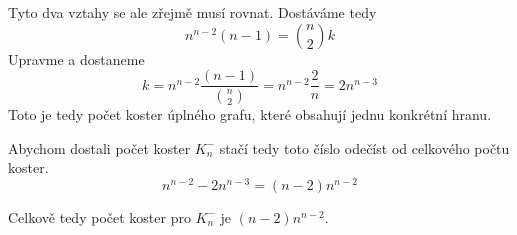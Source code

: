 \documentclass[../main.tex]{subfiles}
\begin{document}
Tyto dva vztahy se ale zřejmě musí rovnat. Dostáváme tedy 
\begin{equation*}
    n^{n-2}(n-1) = \binom{n}{2}k
\end{equation*}
Upravme a dostaneme 
\begin{equation*}
    k = n^{n-2}\frac{(n-1)}{\binom{n}{2}} = n^{n-2}\frac{2}{n} = 2n^{n-3}
\end{equation*}
Toto je tedy počet koster úplného grafu, které obsahují jednu konkrétní hranu.


Abychom dostali počet koster $K_n^-$ stačí tedy toto číslo odečíst od celkového počtu koster. 
\begin{equation*}
    n^{n-2} - 2n^{n-3} = (n-2) n^{n-2}
\end{equation*}

Celkově tedy počet koster pro $K_n^-$ je $(n-2) n^{n-2}$.
\end{document}
